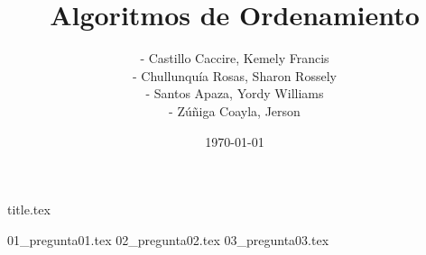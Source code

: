 \documentclass[a4paper,12pt]{article}
\title{Algoritmos de Ordenamiento}
\author{- Castillo Caccire, Kemely Francis\\
        - Chullunquía Rosas, Sharon Rossely\\
        - Santos Apaza, Yordy Williams\\
        - Zúñiga Coayla, Jerson}
\date{\today}
\begin{document}
{title.tex}

{01_pregunta01.tex}
{02_pregunta02.tex}
{03_pregunta03.tex}

\printbibliography[heading=bibintoc]
\end{document}
